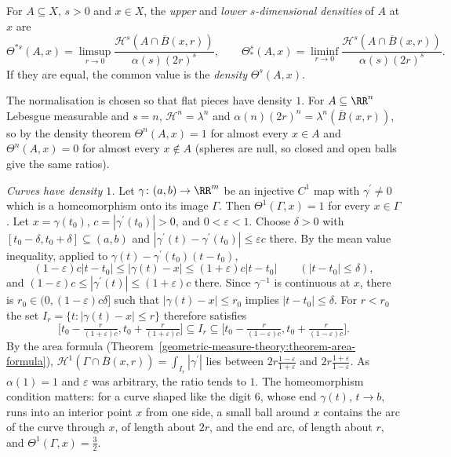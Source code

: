 \begin{definition}\label{geometric-measure-theory:definition-density}
For $A \subseteq X$, $s > 0$ and $x \in X$, the \emph{upper} and \emph{lower $s$-dimensional densities} of $A$ at $x$ are
\[
\Theta^{*s}(A, x) = \limsup_{r \to 0}\frac{\mathcal{H}^s(A \cap \overline{B}(x, r))}{\alpha(s)(2r)^s}, \qquad \Theta^s_*(A, x) = \liminf_{r \to 0}\frac{\mathcal{H}^s(A \cap \overline{B}(x, r))}{\alpha(s)(2r)^s}.
\]
If they are equal, the common value is the \emph{density} $\Theta^s(A, x)$.
\end{definition}

The normalisation is chosen so that flat pieces have density $1$. For $A \subseteq \RR^n$ Lebesgue measurable and $s = n$, $\mathcal{H}^n = \lambda^n$ and $\alpha(n)(2r)^n = \lambda^n(\overline{B}(x, r))$,
so by the density theorem $\Theta^n(A, x) = 1$ for almost every $x \in A$ and $\Theta^n(A, x) = 0$ for almost every $x \notin A$ (spheres are null, so closed and open balls give the same ratios).

\begin{example}\label{geometric-measure-theory:example-density-curve}
\emph{Curves have density $1$.} Let $\gamma \colon (a, b) \to \RR^m$ be an injective $C^1$ map with $\gamma^{\prime} \neq 0$ which is a homeomorphism onto its image $\Gamma$. Then
$\Theta^1(\Gamma, x) = 1$ for every $x \in \Gamma$. Let $x = \gamma(t_0)$, $c = |\gamma^{\prime}(t_0)| > 0$, and $0 < \varepsilon < 1$. Choose $\delta > 0$ with $[t_0 - \delta, t_0 + \delta] \subseteq (a, b)$
and $|\gamma^{\prime}(t) - \gamma^{\prime}(t_0)| \leq \varepsilon c$ there. By the mean value inequality, applied to $\gamma(t) - \gamma^{\prime}(t_0)(t - t_0)$,
\[
(1 - \varepsilon)c|t - t_0| \leq |\gamma(t) - x| \leq (1 + \varepsilon)c|t - t_0| \qquad (|t - t_0| \leq \delta),
\]
and $(1 - \varepsilon)c \leq |\gamma^{\prime}(t)| \leq (1 + \varepsilon)c$ there. Since $\gamma^{-1}$ is continuous at $x$, there is $r_0 \in (0, (1 - \varepsilon)c\delta]$ such that
$|\gamma(t) - x| \leq r_0$ implies $|t - t_0| \leq \delta$. For $r < r_0$ the set $I_r = \{t : |\gamma(t) - x| \leq r\}$ therefore satisfies
\[
\bigl[t_0 - \tfrac{r}{(1 + \varepsilon)c}, t_0 + \tfrac{r}{(1 + \varepsilon)c}\bigr] \subseteq I_r \subseteq \bigl[t_0 - \tfrac{r}{(1 - \varepsilon)c}, t_0 + \tfrac{r}{(1 - \varepsilon)c}\bigr].
\]
By the area formula (Theorem~\ref{geometric-measure-theory:theorem-area-formula}), $\mathcal{H}^1(\Gamma \cap \overline{B}(x, r)) = \int_{I_r}|\gamma^{\prime}|$ lies between $2r\frac{1 - \varepsilon}{1 + \varepsilon}$ and
$2r\frac{1 + \varepsilon}{1 - \varepsilon}$. As $\alpha(1) = 1$ and $\varepsilon$ was arbitrary, the ratio tends to $1$. The homeomorphism condition matters: for a curve shaped like the digit $6$, whose end
$\gamma(t)$, $t \to b$, runs into an interior point $x$ from one side, a small ball around $x$ contains the arc of the curve through $x$, of length about $2r$, and the end arc, of length about $r$, and $\Theta^1(\Gamma, x) = \frac32$.
\end{example}

